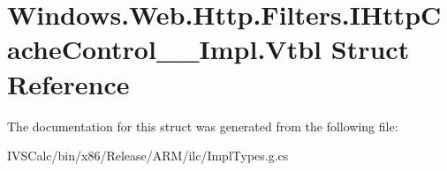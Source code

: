 \hypertarget{struct_windows_1_1_web_1_1_http_1_1_filters_1_1_i_http_cache_control_____impl_1_1_vtbl}{}\section{Windows.\+Web.\+Http.\+Filters.\+I\+Http\+Cache\+Control\+\_\+\+\_\+\+Impl.\+Vtbl Struct Reference}
\label{struct_windows_1_1_web_1_1_http_1_1_filters_1_1_i_http_cache_control_____impl_1_1_vtbl}


The documentation for this struct was generated from the following file\+:\begin{DoxyCompactItemize}
\item 
I\+V\+S\+Calc/bin/x86/\+Release/\+A\+R\+M/ilc/Impl\+Types.\+g.\+cs\end{DoxyCompactItemize}
